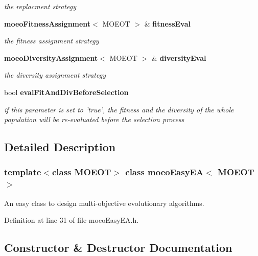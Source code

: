 \begin{CompactItemize}
\begin{CompactList}\small\item\em the replacment strategy \item\end{CompactList}\item 
{\bf moeo\-Fitness\-Assignment}$<$ MOEOT $>$ \& {\bf fitness\-Eval}\label{classmoeoEasyEA_1268fc2f0b62fe51bca17d4efb51954b}

\begin{CompactList}\small\item\em the fitness assignment strategy \item\end{CompactList}\item 
{\bf moeo\-Diversity\-Assignment}$<$ MOEOT $>$ \& {\bf diversity\-Eval}\label{classmoeoEasyEA_b9d1b3790072dbbbe0012a252bab95f4}

\begin{CompactList}\small\item\em the diversity assignment strategy \item\end{CompactList}\item 
bool {\bf eval\-Fit\-And\-Div\-Before\-Selection}\label{classmoeoEasyEA_856a19d9a7c180fe33ce7a5bb010edcc}

\begin{CompactList}\small\item\em if this parameter is set to 'true', the fitness and the diversity of the whole population will be re-evaluated before the selection process \item\end{CompactList}\end{CompactItemize}


\subsection{Detailed Description}
\subsubsection*{template$<$class MOEOT$>$ class moeo\-Easy\-EA$<$ MOEOT $>$}

An easy class to design multi-objective evolutionary algorithms. 



Definition at line 31 of file moeo\-Easy\-EA.h.

\subsection{Constructor \& Destructor Documentation}
